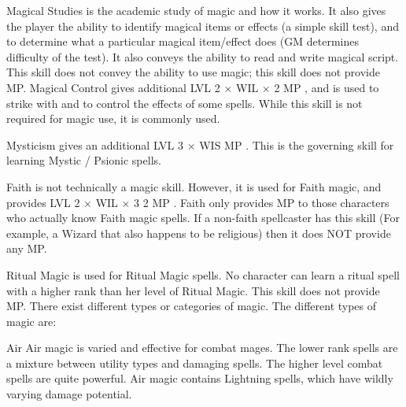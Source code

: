 \documentclass[twoside]{book}
\begin{document}
                  Magical Studies is the academic study of magic
                 and how it works. It also gives the player the ability
                 to identify magical items or effects (a simple skill
                 test), and to determine what a particular magical
                 item/effect does (GM determines difficulty of the test).
                 It also conveys the ability to read and write magical
                 script. This skill does not convey the ability to use
                 magic; this skill does not provide MP. 
                Magical Control gives additional     
                       LVL  2   
                        ×    WIL   
                      ×    2    MP   
                        , and is used to strike with and to control
                      the effects of some spells. While this skill is not
                      required for magic use, it is commonly used.
                
                Mysticism gives an additional     
                       LVL    3   
                        ×    WIS    MP
                           . This is the governing skill
                      for learning Mystic / Psionic spells.
                
                  Faith is not technically a magic skill. However,
                 it is used for Faith magic, and provides   
                       LVL    2   
                        ×    WIL   
                      ×    3  2
                         MP      . Faith
                      only provides MP to those characters who actually
                      know Faith magic spells. If a non-faith spellcaster
                      has this skill (For example, a Wizard that also
                      happens to be religious) then it does NOT provide
                      any MP.
                
                  Ritual Magic is used for Ritual Magic spells. No
                 character can learn a ritual spell with a higher rank
                 than her level of Ritual Magic. This skill does not
                 provide MP. 
              There exist different types or categories of magic.
               The different types of magic are:   
              
                  Air   Air magic is varied
                  and effective for combat mages. The lower rank spells
                  are a mixture between utility types and damaging
                  spells. The higher level combat spells are quite
                  powerful. Air magic contains Lightning spells, which
                  have wildly varying damage potential.
                
\end{document}
